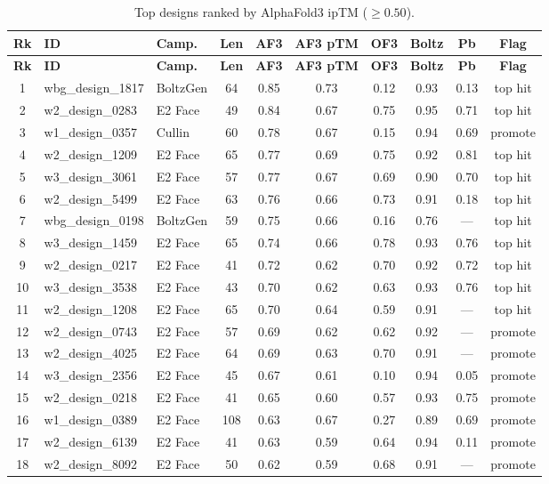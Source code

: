 \documentclass[11pt,a4paper]{article}
\begin{document}
\begin{longtable}{clp{2cm}ccccccc}
\caption{Top designs ranked by AlphaFold3 ipTM ($\geq 0.50$).}
\label{tab:top_af3} \\
\toprule
\textbf{Rk} & \textbf{ID} & \textbf{Camp.} & \textbf{Len} & \textbf{AF3} & \textbf{AF3 pTM} & \textbf{OF3} & \textbf{Boltz} & \textbf{Pb} & \textbf{Flag} \\
\midrule
\endfirsthead
\toprule
\textbf{Rk} & \textbf{ID} & \textbf{Camp.} & \textbf{Len} & \textbf{AF3} & \textbf{AF3 pTM} & \textbf{OF3} & \textbf{Boltz} & \textbf{Pb} & \textbf{Flag} \\
\midrule
\endhead
1  & wbg\_design\_1817 & BoltzGen & 64 & 0.85 & 0.73 & 0.12 & 0.93 & 0.13 & top hit \\
2  & w2\_design\_0283  & E2 Face  & 49 & 0.84 & 0.67 & 0.75 & 0.95 & 0.71 & top hit \\
3  & w1\_design\_0357  & Cullin   & 60 & 0.78 & 0.67 & 0.15 & 0.94 & 0.69 & promote \\
4  & w2\_design\_1209  & E2 Face  & 65 & 0.77 & 0.69 & 0.75 & 0.92 & 0.81 & top hit \\
5  & w3\_design\_3061  & E2 Face  & 57 & 0.77 & 0.67 & 0.69 & 0.90 & 0.70 & top hit \\
6  & w2\_design\_5499  & E2 Face  & 63 & 0.76 & 0.66 & 0.73 & 0.91 & 0.18 & top hit \\
7  & wbg\_design\_0198 & BoltzGen & 59 & 0.75 & 0.66 & 0.16 & 0.76 & ---  & top hit \\
8  & w3\_design\_1459  & E2 Face  & 65 & 0.74 & 0.66 & 0.78 & 0.93 & 0.76 & top hit \\
9  & w2\_design\_0217  & E2 Face  & 41 & 0.72 & 0.62 & 0.70 & 0.92 & 0.72 & top hit \\
10 & w3\_design\_3538  & E2 Face  & 43 & 0.70 & 0.62 & 0.63 & 0.93 & 0.76 & top hit \\
11 & w2\_design\_1208  & E2 Face  & 65 & 0.70 & 0.64 & 0.59 & 0.91 & ---  & top hit \\
12 & w2\_design\_0743  & E2 Face  & 57 & 0.69 & 0.62 & 0.62 & 0.92 & ---  & promote \\
13 & w2\_design\_4025  & E2 Face  & 64 & 0.69 & 0.63 & 0.70 & 0.91 & ---  & promote \\
14 & w3\_design\_2356  & E2 Face  & 45 & 0.67 & 0.61 & 0.10 & 0.94 & 0.05 & promote \\
15 & w2\_design\_0218  & E2 Face  & 41 & 0.65 & 0.60 & 0.57 & 0.93 & 0.75 & promote \\
16 & w1\_design\_0389  & E2 Face  & 108& 0.63 & 0.67 & 0.27 & 0.89 & 0.69 & promote \\
17 & w2\_design\_6139  & E2 Face  & 41 & 0.63 & 0.59 & 0.64 & 0.94 & 0.11 & promote \\
18 & w2\_design\_8092  & E2 Face  & 50 & 0.62 & 0.59 & 0.68 & 0.91 & ---  & promote \\
\bottomrule
\end{longtable}
\end{document}
